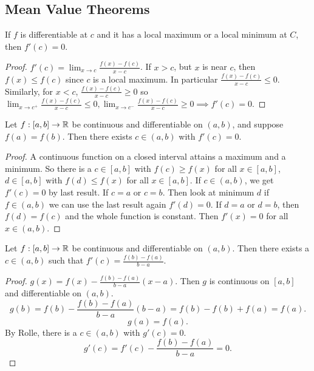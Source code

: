 \documentclass[10pt, a4paper]{article}
\begin{document}
\subsection{Mean Value Theorems}

\begin{proposition}
    If $f$ is differentiable at $c$ and it has a local maximum or a local minimum at $C$,
    then $f'(c) = 0$.

    \begin{proof}
        $f'(c) = \lim_{x \rightarrow c}\frac{f(x) - f(c)}{x - c}$.
        If $x > c$,
        but $x$ is near $c$,
        then $f(x) \leq f(c)$ since $c$ is a local maximum.
        In particular $\frac{f(x) - f(c)}{x - c} \leq 0$.
        Similarly,
        for $x < c$,
        $\frac{f(x) - f(c)}{x - c} \geq 0$ so $\lim_{x \rightarrow c ^ {+}}\frac{f(x) - f(c)}{x - c} \leq 0, \lim_{x \rightarrow c ^ {-}}\frac{f(x) - f(c)}{x - c} \geq 0 \implies f'(c) = 0$.
    \end{proof}
\end{proposition}

\begin{theorem}
    Let $f : [a, b] \rightarrow \mathbb{R}$ be continuous and differentiable on $(a, b)$,
    and suppose $f(a) = f(b)$.
    Then there exists $c \in (a, b)$ with $f'(c) = 0$.

    \begin{proof}
        A continuous function on a closed interval attains a maximum and a minimum.
        So there is a $c \in [a, b]$ with $f(c) \geq f(x)$ for all $x \in [a, b]$,
        $d \in [a, b]$ with $f(d) \leq f(x)$ for all $x \in [a, b]$.
        If $c \in (a, b)$,
        we get $f'(c) = 0$ by last result.
        If $c = a$ or $c = b$.
        Then look at minimum $d$ if $f \in (a, b)$ we can use the last result again $f'(d) = 0$.
        If $d = a$ or $d = b$,
        then $f(d) = f(c)$ and the whole function is constant.
        Then $f'(x) = 0$ for all $x \in (a, b)$.
    \end{proof}
\end{theorem}

\begin{theorem}
    Let $f : [a, b] \rightarrow \mathbb{R}$ be continuous and differentiable on $(a, b)$.
    Then there exists a $c \in (a, b)$ such that $f'(c) = \frac{f(b) - f(a)}{b - a}$.

    \begin{proof}
        $g(x) = f(x) - \frac{f(b) - f(a)}{b - a}(x - a)$.
        Then $g$ is continuous on $[a, b]$ and differentiable on $(a, b)$.
        \[
        g(b) = f(b) - \frac{f(b) - f(a)}{b - a}(b - a) = f(b) - f(b) + f(a) = f(a).
        \]
        \[
        g(a) = f(a).
        \]
        By Rolle,
        there is a $c \in (a, b)$ with $g'(c) = 0$.
        \[
        g'(c) = f'(c) - \frac{f(b) - f(a)}{b - a} = 0.
        \]
    \end{proof}
\end{theorem}
\end{document}
